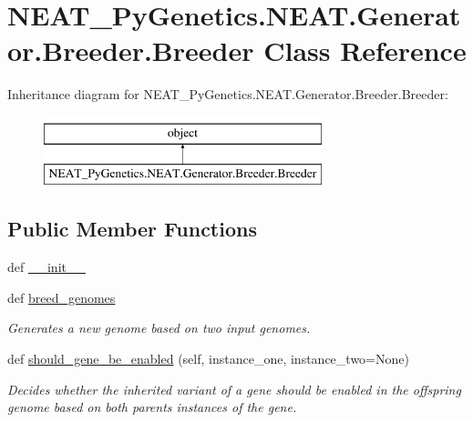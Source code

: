 \hypertarget{classNEAT__PyGenetics_1_1NEAT_1_1Generator_1_1Breeder_1_1Breeder}{}\section{N\+E\+A\+T\+\_\+\+Py\+Genetics.\+N\+E\+A\+T.\+Generator.\+Breeder.\+Breeder Class Reference}
\label{classNEAT__PyGenetics_1_1NEAT_1_1Generator_1_1Breeder_1_1Breeder}
Inheritance diagram for N\+E\+A\+T\+\_\+\+Py\+Genetics.\+N\+E\+A\+T.\+Generator.\+Breeder.\+Breeder\+:\begin{figure}[H]
\begin{center}
\leavevmode
\includegraphics[height=2.000000cm]{classNEAT__PyGenetics_1_1NEAT_1_1Generator_1_1Breeder_1_1Breeder}
\end{center}
\end{figure}
\subsection*{Public Member Functions}
\begin{DoxyCompactItemize}
\item 
def \hyperlink{classNEAT__PyGenetics_1_1NEAT_1_1Generator_1_1Breeder_1_1Breeder_a99ffddd6afb3f995598605e165772515}{\+\_\+\+\_\+init\+\_\+\+\_\+}
\item 
def \hyperlink{classNEAT__PyGenetics_1_1NEAT_1_1Generator_1_1Breeder_1_1Breeder_a6e78ccec465831c858910b1319e75076}{breed\+\_\+genomes}
\begin{DoxyCompactList}\small\item\em Generates a new genome based on two input genomes. \end{DoxyCompactList}\item 
def \hyperlink{classNEAT__PyGenetics_1_1NEAT_1_1Generator_1_1Breeder_1_1Breeder_a761995541d6d9ff88e2ee112a57dff0f}{should\+\_\+gene\+\_\+be\+\_\+enabled} (self, instance\+\_\+one, instance\+\_\+two=None)
\begin{DoxyCompactList}\small\item\em Decides whether the inherited variant of a gene should be enabled in the offspring genome based on both parents\textquotesingle{} instances of the gene. \end{DoxyCompactList}\end{DoxyCompactItemize}
